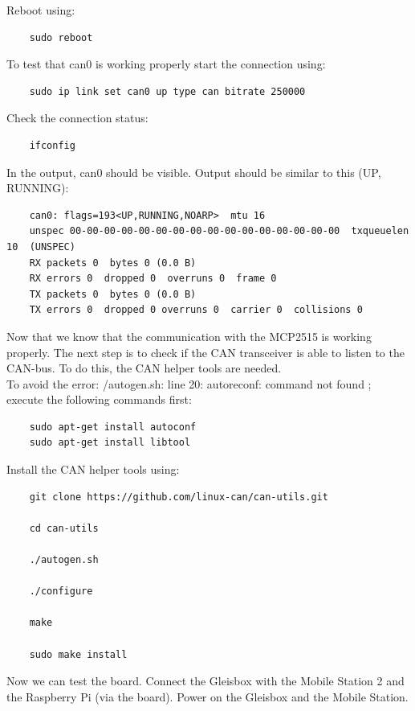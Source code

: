 Reboot using:

\begin{verbatim}
	sudo reboot
\end{verbatim}

To test that can0 is working properly start the connection using:

\begin{verbatim}
	sudo ip link set can0 up type can bitrate 250000
\end{verbatim}

Check the connection status:

\begin{verbatim}
	ifconfig
\end{verbatim}

In the output, can0 should be visible. Output should be similar to this (UP, RUNNING):

\begin{verbatim}
	can0: flags=193<UP,RUNNING,NOARP>  mtu 16
	unspec 00-00-00-00-00-00-00-00-00-00-00-00-00-00-00-00  txqueuelen 10  (UNSPEC)
	RX packets 0  bytes 0 (0.0 B)
	RX errors 0  dropped 0  overruns 0  frame 0
	TX packets 0  bytes 0 (0.0 B)
	TX errors 0  dropped 0 overruns 0  carrier 0  collisions 0
\end{verbatim}

Now that we know that the communication with the MCP2515 is working properly. The next step is to check if the CAN transceiver is able to listen to the CAN-bus. To do this, the CAN helper tools are needed. \\

To avoid the error: /autogen.sh: line 20: autoreconf: command not found ; execute the following commands first:

\begin{verbatim}
	sudo apt-get install autoconf
	sudo apt-get install libtool
\end{verbatim}

Install the CAN helper tools using:

\begin{verbatim}
	git clone https://github.com/linux-can/can-utils.git
	
	cd can-utils
	
	./autogen.sh
	
	./configure
	
	make
	
	sudo make install
\end{verbatim}

Now we can test the board. Connect the Gleisbox with the Mobile Station 2 and the Raspberry Pi (via the board). Power on the Gleisbox and the Mobile Station.

